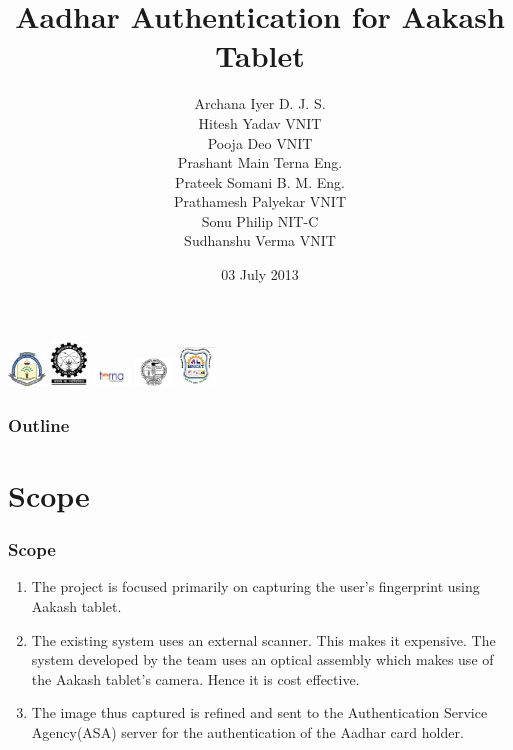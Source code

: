 \documentclass[12pt]{beamer}
\title{Aadhar Authentication for Aakash Tablet}
\author{Archana Iyer\hskip60pt D. J. S. \\Hitesh Yadav\hskip60pt VNIT \\ Pooja Deo \hskip60pt VNIT \\Prashant Main \hskip50pt Terna Eng.\\Prateek Somani \hskip60pt B. M. Eng. \\Prathamesh Palyekar \hskip20pt VNIT \\Sonu Philip \hskip60pt NIT-C \\Sudhanshu Verma \hskip40pt VNIT }
\date{\vskip-20pt 03 July 2013}
\begin{document}
\begin{frame}

\titlepage
\vskip-20pt
 \includegraphics[width=1cm]{./dj.jpg}
\hfill
 \includegraphics[width=1cm]{./nitc.jpg}
\hfill
 \includegraphics[width=1cm]{./t.jpg}
\hfill
 \includegraphics[width=1cm]{./vnit.jpg}
\hfill
 \includegraphics[width=1cm]{./111.jpg}

 \end{frame}

\begin{frame}
\frametitle{Outline}
\begin{multicols}{2}
\tableofcontents
\end{multicols}
\end{frame}

\section{Scope}
\begin{frame}[c]
\frametitle{Scope}

\begin{enumerate}
\item The project is focused primarily on capturing the user’s fingerprint using Aakash tablet.
\item The existing system uses an external scanner. This makes it expensive. The system developed by the team uses an optical assembly which makes use of the Aakash tablet’s camera. Hence it is cost effective.
\item The image thus captured is refined and sent to the Authentication Service Agency(ASA) server for the authentication of the Aadhar card holder. 
\end{enumerate}
\end{frame}
\end{document}
